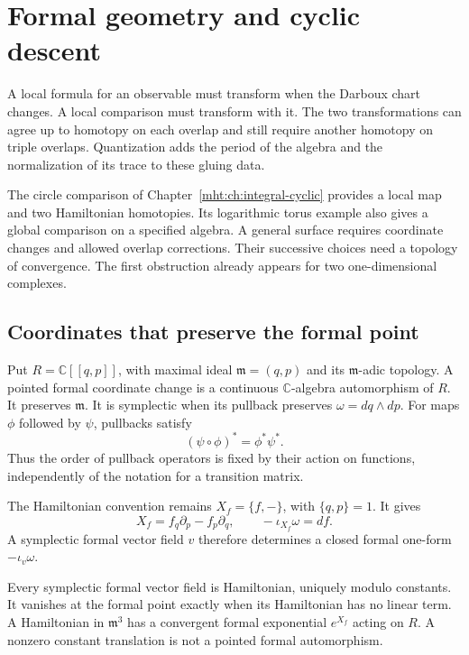 \chapter{Formal geometry and cyclic descent}
\label{mht:ch:cyclic-descent}

A local formula for an observable must transform when the Darboux
chart changes. A local comparison must transform with it. The two
transformations can agree up to homotopy on each overlap and still
require another homotopy on triple overlaps. Quantization adds the
period of the algebra and the normalization of its trace to these
gluing data.

The circle comparison of Chapter~\ref{mht:ch:integral-cyclic}
provides a local map and two Hamiltonian homotopies. Its logarithmic
torus example also gives a global comparison on a specified algebra.
A general surface requires coordinate changes and allowed overlap
corrections. Their successive choices need a topology of convergence. The first obstruction
already appears for two one-dimensional complexes.

\section{Coordinates that preserve the formal point}

Put $R=\mathbb C[[q,p]]$, with maximal ideal $\mathfrak m=(q,p)$
and its $\mathfrak m$-adic topology. A pointed formal coordinate
change is a continuous $\mathbb C$-algebra automorphism of $R$.
It preserves $\mathfrak m$. It is symplectic when its pullback
preserves $\omega=dq\wedge dp$.
For maps $\phi$ followed by $\psi$, pullbacks satisfy
\[
 (\psi\circ\phi)^*=\phi^*\psi^*.
\]
Thus the order of pullback operators is fixed by their action on
functions, independently of the notation for a transition matrix.

The Hamiltonian convention remains
$X_f=\{f,-\}$, with $\{q,p\}=1$. It gives
\[
 X_f=f_q\partial_p-f_p\partial_q,
 \qquad -\iota_{X_f}\omega=df.
\]
A symplectic formal vector field $v$ therefore determines a closed
formal one-form $-\iota_v\omega$.

\begin{proposition}\label{mht:prop:formal-coordinate-hamiltonians}
Every symplectic formal vector field is Hamiltonian, uniquely modulo
constants. It vanishes at the formal point exactly when its
Hamiltonian has no linear term. A Hamiltonian in $\mathfrak m^3$
has a convergent formal exponential $e^{X_f}$ acting on $R$.
A nonzero constant translation is not a pointed formal
automorphism.
\end{proposition}

